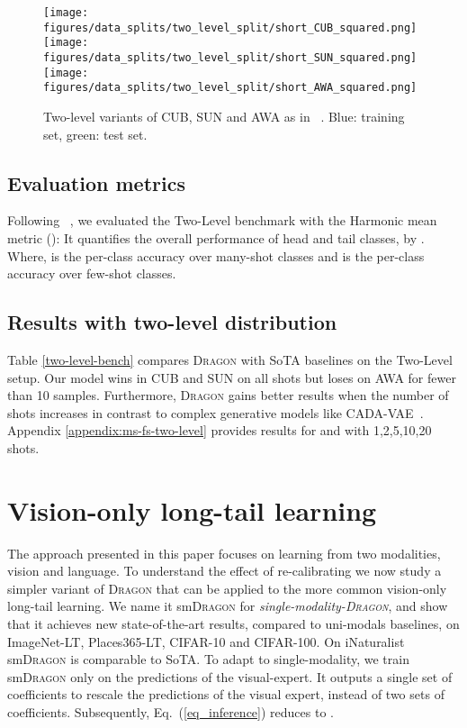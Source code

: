 \documentclass[10pt,twocolumn,letterpaper]{article}
\renewcommand{\eqref}[1]{Eq.~(\ref{#1})}
\newcommand{\DRAGON}{\textsc{Dragon}}
\newcommand{\TwoLevel}{Two-Level}
\begin{document}
\begin{figure}[t!]
    \centering
    \texttt{[image: figures/data\_splits/two\_level\_split/short\_CUB\_squared.png]}
    \texttt{[image: figures/data\_splits/two\_level\_split/short\_SUN\_squared.png]}
    \texttt{[image: figures/data\_splits/two\_level\_split/short\_AWA\_squared.png]}
    \caption{Two-level variants of CUB, SUN and AWA as in ~\cite{Schnfeld2019GeneralizedZL}. Blue: training set, green: test set. 
    }
    \label{fig:twostep}
\end{figure}



\subsection{Evaluation metrics}
Following  ~\cite{Schnfeld2019GeneralizedZL}, we evaluated the \TwoLevel{} benchmark with the Harmonic mean metric  (): It quantifies the overall performance of head and tail classes, by . Where,  is the per-class accuracy over many-shot classes and  is the per-class accuracy over few-shot classes.

\subsection{Results with two-level distribution}

Table \ref{two-level-bench} compares \DRAGON{} with SoTA baselines on the \TwoLevel{} setup. Our model wins in CUB and SUN on all shots but loses on AWA for fewer than 10 samples. Furthermore, \DRAGON{}  gains better results when the number of shots increases in contrast to complex generative models like CADA-VAE~\cite{Schnfeld2019GeneralizedZL}. Appendix \ref{appendix:ms-fs-two-level}
provides results for  and  with 1,2,5,10,20 shots.


\section{Vision-only long-tail learning}
\label{sec:extension}
The approach presented in this paper focuses on learning from two modalities, vision and language. To understand the effect of re-calibrating we now study a simpler variant of \DRAGON{} that can be applied to the more common vision-only long-tail learning.
We name it sm\DRAGON{} for \textit{single-modality-\DRAGON{}}, and show that it achieves new state-of-the-art results, compared to uni-modals baselines, on ImageNet-LT, Places365-LT, CIFAR-10 and CIFAR-100. On iNaturalist sm\DRAGON{} is comparable to SoTA.
To adapt to single-modality, we train sm\DRAGON{} only on the predictions of the visual-expert.
It outputs a single set of coefficients  to rescale the predictions of the visual expert, instead of two sets of coefficients. Subsequently, \eqref{eq_inference} reduces to 
.
\end{document}

